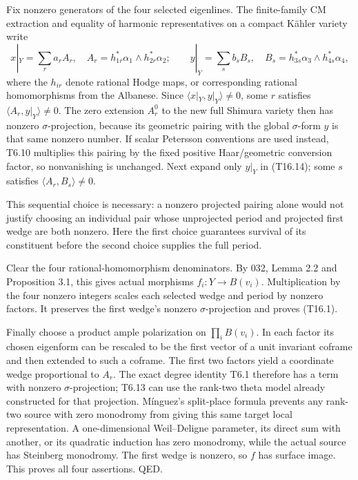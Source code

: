 Fix nonzero generators of the four selected eigenlines. The finite-family CM extraction and equality of harmonic representatives on a compact Kähler variety write \[
x|_Y=\sum_r a_r A_r,\quad
A_r=h_{1r}^*\alpha_1\wedge h_{2r}^*\alpha_2;
\qquad
y|_Y=\sum_s b_s B_s,\quad
B_s=h_{3s}^*\alpha_3\wedge h_{4s}^*\alpha_4,
\tag{T16.14}
\] where the \(h_{ir}\) denote rational Hodge maps, or corresponding rational homomorphisms from the Albanese. Since \(\langle x|_Y,y|_Y\rangle\ne0\), some \(r\) satisfies \(\langle A_r,y|_Y\rangle\ne0\). The zero extension \(A_r^0\) to the new full Shimura variety then has nonzero \(\sigma\)-projection, because its geometric pairing with the global \(\sigma\)-form \(y\) is that same nonzero number. If scalar Petersson conventions are used instead, T6.10 multiplies this pairing by the fixed positive Haar/geometric conversion factor, so nonvanishing is unchanged. Next expand only \(y|_Y\) in (T16.14); some \(s\) satisfies \(\langle A_r,B_s\rangle\ne0\).

This sequential choice is necessary: a nonzero projected pairing alone would not justify choosing an individual pair whose unprojected period and projected first wedge are both nonzero. Here the first choice guarantees survival of its constituent before the second choice supplies the full period.

Clear the four rational-homomorphism denominators. By 032, Lemma 2.2 and Proposition 3.1, this gives actual morphisms \(f_i:Y\to B(v_i)\). Multiplication by the four nonzero integers scales each selected wedge and period by nonzero factors. It preserves the first wedge's nonzero \(\sigma\)-projection and proves (T16.1).

Finally choose a product ample polarization on \(\prod_i B(v_i)\). In each factor its chosen eigenform can be rescaled to be the first vector of a unit invariant coframe and then extended to such a coframe. The first two factors yield a coordinate wedge proportional to \(A_r\). The exact degree identity T6.1 therefore has a term with nonzero \(\sigma\)-projection; T6.13 can use the rank-two theta model already constructed for that projection. Mínguez's split-place formula prevents any rank-two source with zero monodromy from giving this same target local representation. A one-dimensional Weil--Deligne parameter, its direct sum with another, or its quadratic induction has zero monodromy, while the actual source has Steinberg monodromy. The first wedge is nonzero, so \(f\) has surface image. This proves all four assertions. QED.

